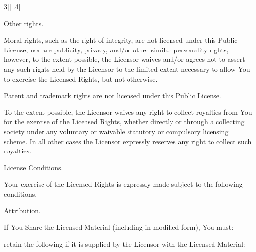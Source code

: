 \documentclass[8pt,cleardoubleempty]{scrbook}
\begin{document}
\begin{multicols}{3}[][.4\paperwidth]
\begin{longenum}
\begin{longenum}
\begin{longenum}
       \end{longenum}

 \newpage

  \item Other rights.

       \begin{longenum}

       \item Moral rights, such as the right of integrity, are not
          licensed under this Public License, nor are publicity,
          privacy, and/or other similar personality rights; however, to
          the extent possible, the Licensor waives and/or agrees not to
          assert any such rights held by the Licensor to the limited
          extent necessary to allow You to exercise the Licensed
          Rights, but not otherwise.

       \item Patent and trademark rights are not licensed under this
          Public License.

       \item To the extent possible, the Licensor waives any right to
          collect royalties from You for the exercise of the Licensed
          Rights, whether directly or through a collecting society
          under any voluntary or waivable statutory or compulsory
          licensing scheme. In all other cases the Licensor expressly
          reserves any right to collect such royalties.

       \end{longenum}

  \end{longenum}

 \item License Conditions.

  Your exercise of the Licensed Rights is expressly made subject
  to the following conditions.

  \begin{longenum}
  \item Attribution.

       \begin{longenum}

       \item If You Share the Licensed Material (including in modified
          form), You must:

            \begin{longenum}

            \item retain the following if it is supplied by the Licensor
               with the Licensed Material:


\end{longenum}
\end{longenum}
\end{longenum}
\end{longenum}
\end{multicols}
\end{document}
